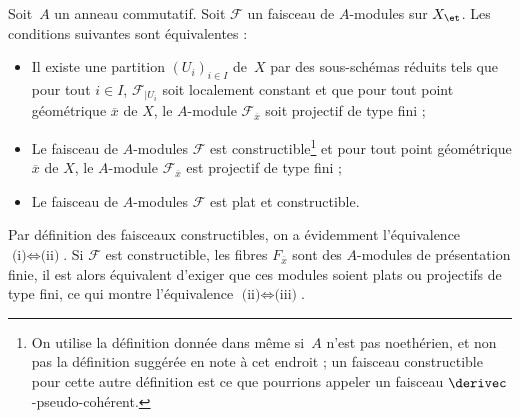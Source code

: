 \documentclass[10pt]{../fichiers-configuration-latex/smfart}
\begin{document}
\begin{lemme2}
Soit $A$ un anneau commutatif. Soit $\mathscr F$ un faisceau de $A$-modules
sur $X_\et$. Les conditions suivantes sont équivalentes :
\begin{itemize}
\item[(i)] Il existe une partition $(U_i)_{i\in I}$ de $X$ par des
sous-schémas réduits tels que pour tout $i\in I$,
$\mathscr F_{|U_i}$ soit localement constant et que pour tout point
géométrique $\overline x$ de $X$, le $A$-module $\mathscr F_{\overline x}$
soit projectif de type fini ;
\item[(ii)] Le faisceau de $A$-modules $\mathscr F$ est
constructible\;\footnote{On utilise la définition donnée dans
 même si $A$ n'est pas noethérien, et non pas la définition
suggérée en note à cet endroit ; un faisceau constructible pour cette autre
définition est ce que pourrions appeler un faisceau
$\derivec$-pseudo-cohérent.} et pour tout point géométrique $\overline x$ de
$X$, le $A$-module $\mathscr F_{\overline x}$ est projectif  de type fini ;
\item[(iii)] Le faisceau de $A$-modules $\mathscr F$ est plat et
constructible.
\end{itemize}
\end{lemme2}

Par définition des faisceaux constructibles, on a évidemment l'équivalence
$\text{(i)}\Longleftrightarrow\text{(ii)}$. Si $\mathscr F$ est
constructible, les fibres $F_{\overline x}$ sont des $A$-modules de
présentation finie, il est alors équivalent d'exiger que ces modules soient
plats ou projectifs de type fini, ce qui montre l'équivalence
$\text{(ii)}\Longleftrightarrow\text{(iii)}$. 
\end{document}

